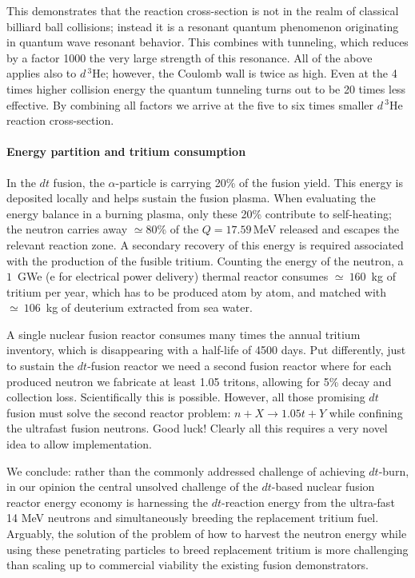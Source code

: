 \documentclass[particles,article,accept,pdftex,moreauthors]{Definitions/mdpi}
\begin{document}
This demonstrates that the reaction cross-section is not in the realm of classical billiard ball collisions; instead it is a resonant quantum phenomenon originating in quantum wave resonant behavior. This combines with tunneling, which reduces by a factor 1000 the very large strength of this resonance. All of the above applies also to $d\,{}^{3\!}\mathrm{He}$; however, the Coulomb wall is twice as high. Even at the 4 times higher collision energy the quantum tunneling turns out to be 20 times less effective. By combining all factors we arrive at the five to six times smaller $d\,{}^{3}\mathrm{He}$ reaction cross-section.

\paragraph*{\bf Energy partition and tritium consumption}
In the $dt$ fusion, the $\alpha$-particle is carrying 20\% of the fusion yield. This energy is deposited locally and helps sustain the fusion plasma. When evaluating the energy balance in a burning plasma, only these 20\% contribute to self-heating; the neutron carries away $\simeq$80\% of the $Q=17.59$\,MeV released and escapes the relevant reaction zone. A secondary recovery of this energy is required associated with the production of the fusible tritium. Counting the energy of the neutron, a $1$~GWe (e for electrical power delivery) thermal reactor consumes $\simeq\ 160$~kg of tritium per year, which has to be produced atom by atom, and matched with $\simeq\ 106$~kg of deuterium extracted from sea water. 

A single nuclear fusion reactor consumes many times the annual tritium inventory, which is disappearing with a half-life of 4500 days. Put differently, just to sustain the $dt$-fusion reactor we need a second fusion reactor where for each produced neutron we fabricate at least 1.05 tritons, allowing for 5\% decay and collection loss. Scientifically this is possible. However, all those promising $dt$ fusion must solve the second reactor problem: $n+X\to 1.05 t+Y$ while confining the ultrafast fusion neutrons. Good luck! Clearly all this requires a very novel idea to allow implementation.

We conclude: rather than the commonly addressed challenge of achieving $dt$-burn, in our opinion the central unsolved challenge of the $dt$-based nuclear fusion reactor energy economy is harnessing the $dt$-reaction energy from the ultra-fast 14 MeV neutrons and simultaneously breeding the replacement tritium fuel. Arguably, the solution of the problem of how to harvest the neutron energy while using these penetrating particles to breed replacement tritium is more challenging than scaling up to commercial viability the existing fusion demonstrators.
\end{document}
